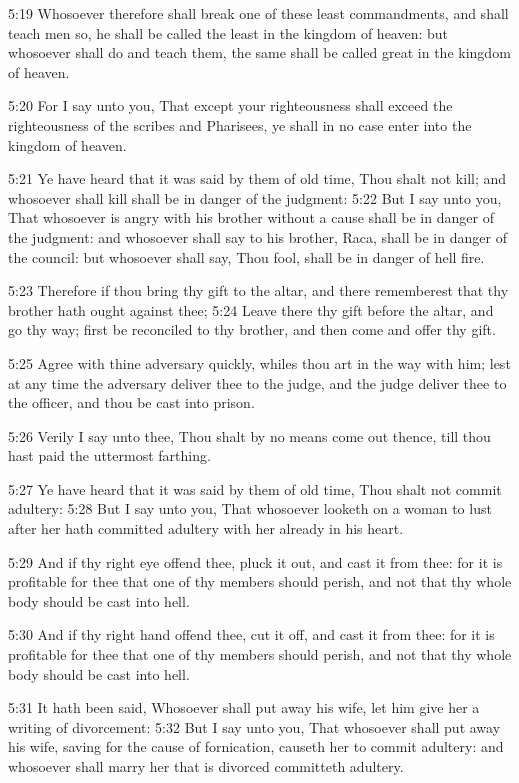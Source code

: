 5:19 Whosoever therefore shall break one of these least commandments, and shall teach men so, he shall be called the least in the kingdom of heaven: but whosoever shall do and teach them, the same shall be called great in the kingdom of heaven.

5:20 For I say unto you, That except your righteousness shall exceed the righteousness of the scribes and Pharisees, ye shall in no case enter into the kingdom of heaven.

5:21 Ye have heard that it was said by them of old time, Thou shalt not kill; and whosoever shall kill shall be in danger of the judgment: 5:22 But I say unto you, That whosoever is angry with his brother without a cause shall be in danger of the judgment: and whosoever shall say to his brother, Raca, shall be in danger of the council: but whosoever shall say, Thou fool, shall be in danger of hell fire.

5:23 Therefore if thou bring thy gift to the altar, and there rememberest that thy brother hath ought against thee; 5:24 Leave there thy gift before the altar, and go thy way; first be reconciled to thy brother, and then come and offer thy gift.

5:25 Agree with thine adversary quickly, whiles thou art in the way with him; lest at any time the adversary deliver thee to the judge, and the judge deliver thee to the officer, and thou be cast into prison.

5:26 Verily I say unto thee, Thou shalt by no means come out thence, till thou hast paid the uttermost farthing.

5:27 Ye have heard that it was said by them of old time, Thou shalt not commit adultery: 5:28 But I say unto you, That whosoever looketh on a woman to lust after her hath committed adultery with her already in his heart.

5:29 And if thy right eye offend thee, pluck it out, and cast it from thee: for it is profitable for thee that one of thy members should perish, and not that thy whole body should be cast into hell.

5:30 And if thy right hand offend thee, cut it off, and cast it from thee: for it is profitable for thee that one of thy members should perish, and not that thy whole body should be cast into hell.

5:31 It hath been said, Whosoever shall put away his wife, let him give her a writing of divorcement: 5:32 But I say unto you, That whosoever shall put away his wife, saving for the cause of fornication, causeth her to commit adultery: and whosoever shall marry her that is divorced committeth adultery.


